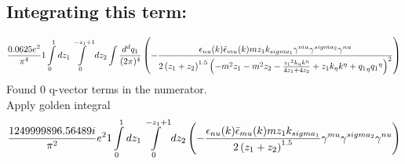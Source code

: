 \subsection*{Integrating this term:}
\begin{dmath}\frac{0.0625 e^{2}}{\pi^{4}}1\int\limits_{ 0 }^{ 1 } d{ z_{ 1 } }\int\limits_{ 0 }^{ - { z_{ 1 } } + 1 } d{ z_{ 2 } }\int\frac{d^d q_1 }{ (2\pi)^4 }\left(- \frac{\epsilon_{ \\nu }({ k }) \bar{\epsilon}_{ \\mu }({ k }) m { z_{ 1 } } { { k }_{ \\sigma_1 } } { \gamma^{ \\mu } } { \gamma^{ \\sigma_2 } } { \gamma^{ \\nu } }}{2 \left({ z_{ 1 } } + { z_{ 2 } }\right)^{1.5} \left(- m^{2} { z_{ 1 } } - m^{2} { z_{ 2 } } - \frac{{ z_{ 1 } }^{2} { { k }_{ \eta } } { { k }^{ \eta } }}{4 { z_{ 1 } } + 4 { z_{ 2 } }} + { z_{ 1 } } { { k }_{ \eta } } { { k }^{ \eta } } + { { q_1 }_{ \eta } } { { q_1 }^{ \eta } }\right)^{2}}\right)\end{dmath}
Found 0 q-vector terms in the numerator.\\
Apply golden integral
\begin{dmath}\frac{1249999896.56489 i}{\pi^{2}} e^{2}1\int\limits_{ 0 }^{ 1 } d{ z_{ 1 } }\int\limits_{ 0 }^{ - { z_{ 1 } } + 1 } d{ z_{ 2 } }\left(- \frac{\epsilon_{ \\nu }({ k }) \bar{\epsilon}_{ \\mu }({ k }) m { z_{ 1 } } { { k }_{ \\sigma_1 } }}{2 \left({ z_{ 1 } } + { z_{ 2 } }\right)^{1.5}} { \gamma^{ \\mu } } { \gamma^{ \\sigma_2 } } { \gamma^{ \\nu } }\right)\end{dmath}
